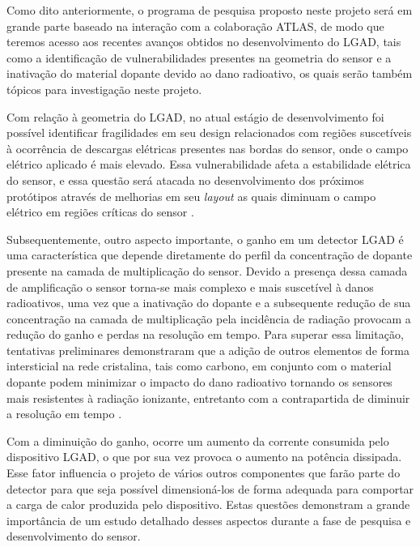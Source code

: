 \thispagestyle{plain}
Como dito anteriormente, o programa de pesquisa proposto neste projeto será em grande parte baseado na interação com a colaboração ATLAS, de modo que teremos acesso aos recentes avanços obtidos no desenvolvimento do LGAD, tais como a identificação de vulnerabilidades presentes na geometria do sensor e a inativação do material dopante devido ao dano radioativo, os quais serão também tópicos para investigação neste projeto.

Com relação à geometria do LGAD, no atual estágio de desenvolvimento foi possível identificar fragilidades em seu design relacionados com regiões suscetíveis à ocorrência de descargas elétricas presentes nas bordas do sensor, onde o campo elétrico aplicado é mais elevado. Essa vulnerabilidade afeta a estabilidade elétrica do sensor, e essa questão será atacada no desenvolvimento dos próximos protótipos através de melhorias em seu {\it layout} as quais diminuam o campo elétrico em regiões críticas do sensor \cite{tdr}.  
\thispagestyle{plain}
   
Subsequentemente, outro aspecto importante, o ganho em um detector LGAD é uma característica que depende diretamente do perfil da concentração de dopante presente na camada de multiplicação do sensor. Devido a presença dessa camada de amplificação o sensor torna-se mais complexo e mais suscetível à danos radioativos, uma vez que a inativação do dopante e a subsequente redução de sua concentração na camada de multiplicação pela incidência de radiação provocam a redução do ganho e perdas na resolução em tempo. Para superar essa limitação, tentativas preliminares demonstraram que a adição de outros elementos de forma intersticial na rede cristalina, tais como carbono, em conjunto com o material dopante podem minimizar o impacto do dano radioativo tornando os sensores mais resistentes à radiação ionizante, entretanto com a contrapartida de diminuir a resolução em tempo \cite{tdr}. 

Com a diminuição do ganho, ocorre um aumento da corrente consumida pelo dispositivo LGAD, o que por sua vez provoca o aumento na potência dissipada. Esse fator influencia o projeto de vários outros componentes que farão parte do detector para que seja possível dimensioná-los de forma adequada para comportar a carga de calor produzida pelo dispositivo. Estas questões  demonstram a grande importância de um estudo detalhado desses aspectos durante a fase de pesquisa e desenvolvimento do sensor. %

